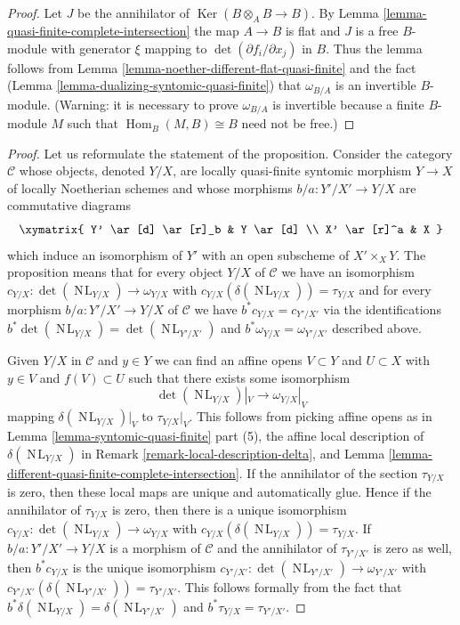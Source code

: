 \documentclass[10pt,a4paper]{amsart}
\theoremstyle{plain}
\theoremstyle{definition}
\theoremstyle{remark}
\numberwithin{equation}{subsection}
\def\Hom{\mathop{\mathrm{Hom}}\nolimits}
\def\NL{\mathop{N\!L}\nolimits}
\def\Ker{\mathop{\mathrm{Ker}}}
\begin{document}
\begin{proof}
Let $J$ be the annihilator of $\Ker(B \otimes_A B \to B)$.
By Lemma \ref{lemma-quasi-finite-complete-intersection}
the map $A \to B$ is flat and
$J$ is a free $B$-module with generator $\xi$ mapping to
$\det(\partial f_i/\partial x_j)$ in $B$.
Thus the lemma follows from
Lemma \ref{lemma-noether-different-flat-quasi-finite}
and the fact (Lemma \ref{lemma-dualizing-syntomic-quasi-finite})
that $\omega_{B/A}$ is an invertible $B$-module.
(Warning: it is necessary to prove $\omega_{B/A}$
is invertible because a finite $B$-module $M$ such
that $\Hom_B(M, B) \cong B$ need not be free.)
\end{proof}

\begin{proof}
Let us reformulate the statement of the proposition. Consider the category
$\mathcal{C}$ whose objects, denoted $Y/X$, are locally quasi-finite syntomic
morphism $Y \to X$ of locally Noetherian schemes and whose morphisms
$b/a : Y'/X' \to Y/X$ are commutative diagrams
$$
\xymatrix{
Y' \ar[d] \ar[r]_b & Y \ar[d] \\
X' \ar[r]^a & X
}
$$
which induce an isomorphism of $Y'$ with an open subscheme of
$X' \times_X Y$. The proposition means that for every object
$Y/X$ of $\mathcal{C}$ we have an isomorphism
$c_{Y/X} : \det(\NL_{Y/X}) \to \omega_{Y/X}$
with $c_{Y/X}(\delta(\NL_{Y/X})) = \tau_{Y/X}$
and for every morphism $b/a : Y'/X' \to Y/X$ of $\mathcal{C}$ we have
$b^*c_{Y/X} = c_{Y'/X'}$ via the identifications
$b^*\det(\NL_{Y/X}) = \det(\NL_{Y'/X'})$ and
$b^*\omega_{Y/X} = \omega_{Y'/X'}$ described above.

\medskip\noindent
Given $Y/X$ in $\mathcal{C}$ and $y \in Y$ we can find
an affine opens $V \subset Y$ and $U \subset X$ with
$y \in V$ and $f(V) \subset U$
such that there exists some isomorphism
$$
\det(\NL_{Y/X})|_V \longrightarrow \omega_{Y/X}|_V
$$
mapping $\delta(\NL_{Y/X})|_V$ to $\tau_{Y/X}|_V$. This follows
from picking affine opens as in
Lemma \ref{lemma-syntomic-quasi-finite} part (5), the affine
local description of $\delta(\NL_{Y/X})$ in
Remark \ref{remark-local-description-delta}, and
Lemma \ref{lemma-different-quasi-finite-complete-intersection}.
If the annihilator of the section $\tau_{Y/X}$ is zero, then
these local maps are unique and automatically glue. Hence if the annihilator
of $\tau_{Y/X}$ is zero, then there is a unique isomorphism
$c_{Y/X} : \det(\NL_{Y/X}) \to \omega_{Y/X}$ with
$c_{Y/X}(\delta(\NL_{Y/X})) = \tau_{Y/X}$.
If $b/a : Y'/X' \to Y/X$ is a morphism of $\mathcal{C}$
and the annihilator of $\tau_{Y'/X'}$ is zero as well,
then $b^*c_{Y/X}$ is the unique isomorphism
$c_{Y'/X'} : \det(\NL_{Y'/X'}) \to \omega_{Y'/X'}$ with
$c_{Y'/X'}(\delta(\NL_{Y'/X'})) = \tau_{Y'/X'}$.
This follows formally from the fact that
$b^*\delta(\NL_{Y/X}) = \delta(\NL_{Y'/X'})$ and
$b^*\tau_{Y/X} = \tau_{Y'/X'}$.


\end{proof}
\end{document}
